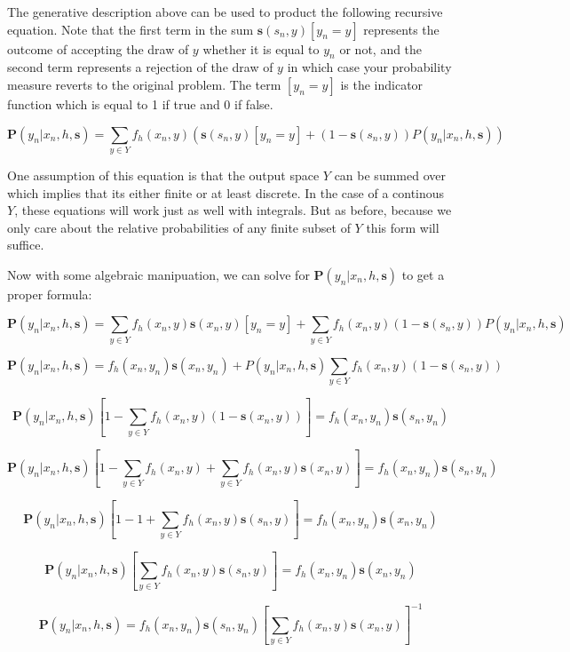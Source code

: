 \documentclass[twoside]{article}
\begin{document}
The generative description above can be used to product the following recursive equation. Note that the first term in the sum \(\mathbf{s}(s_n,y)\left [y_n = y\right ]\) represents the outcome of accepting the draw of \(y\) whether it is equal to \(y_n\) or not, and the second term represents a rejection of the draw of \(y\) in which case your probability measure reverts to the original problem. The term \(\left [y_n = y\right ]\) is the indicator function which is equal to 1 if true and 0 if false.

\[\mathbf{P}(y_n|x_n,h,\mathbf{s})=\sum_{y \in Y}f_h(x_n,y)\left(\mathbf{s}(s_n,y)\left [y_n = y\right ] + (1-\mathbf{s}(s_n,y))P(y_n|x_n,h,\mathbf{s})\right)\]

One assumption of this equation is that the output space \(Y\) can be summed over which implies that its either finite or at least discrete. In the case of a continous \(Y\), these equations will work just as well with integrals. But as before, because we only care about the relative probabilities of any finite subset of \(Y\) this form will suffice.

Now with some algebraic manipuation, we can solve for \(\mathbf{P}(y_n|x_n,h,\mathbf{s})\) to get a proper formula:

\[\mathbf{P}(y_n|x_n,h,\mathbf{s})=\sum_{y \in Y}f_h(x_n,y)\mathbf{s}(x_n,y)\left [y_n = y\right ] +\sum_{y \in Y}f_h(x_n,y)(1-\mathbf{s}(s_n,y))P(y_n|x_n,h,\mathbf{s})\]

\[\mathbf{P}(y_n|x_n,h,\mathbf{s})=f_h(x_n,y_n)\mathbf{s}(x_n,y_n) +P(y_n|x_n,h,\mathbf{s})\sum_{y \in Y}f_h(x_n,y)(1-\mathbf{s}(s_n,y))\]

\[\mathbf{P}(y_n|x_n,h,\mathbf{s})\left [ 1 - \sum_{y \in Y}f_h(x_n,y)(1-\mathbf{s}(x_n,y)) \right ]=f_h(x_n,y_n)\mathbf{s}(s_n,y_n) \]

\[\mathbf{P}(y_n|x_n,h,\mathbf{s})\left [ 1 - \sum_{y \in Y}f_h(x_n,y)+\sum_{y \in Y}f_h(x_n,y)\mathbf{s}(x_n,y) \right ]=f_h(x_n,y_n)\mathbf{s}(s_n,y_n) \]

\[\mathbf{P}(y_n|x_n,h,\mathbf{s})\left [ 1 - 1+\sum_{y \in Y}f_h(x_n,y)\mathbf{s}(s_n,y) \right ]=f_h(x_n,y_n)\mathbf{s}(x_n,y_n) \]

\[\mathbf{P}(y_n|x_n,h,\mathbf{s})\left [\sum_{y \in Y}f_h(x_n,y)\mathbf{s}(s_n,y) \right ]=f_h(x_n,y_n)\mathbf{s}(x_n,y_n) \]

\begin{equation}
\label{eq:bias_corrected_prob}
\mathbf{P}(y_n|x_n,h,\mathbf{s})=f_h(x_n,y_n)\mathbf{s}(s_n,y_n)\left [\sum_{y \in Y}f_h(x_n,y)\mathbf{s}(x_n,y) \right ]^{-1} 
\end{equation}
\end{document}
